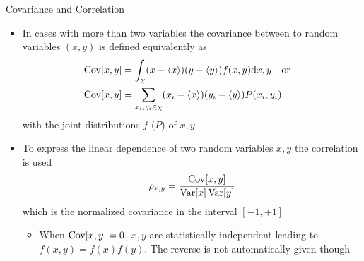   \begin{frame}{Covariance and Correlation}
    \begin{itemize}
      \item In cases with more than two variables the covariance between to random variables $(x, y)$ is defined equivalently as
        \begin{align*}
          \operatorname{Cov}[x, y] &= \int_\chi (x-\langle x\rangle)(y-\langle y\rangle) f(x,y) \mathrm{d}x, y
          \quad\mathrm{or}\quad \\
          \operatorname{Cov}[x, y] &= \sum_{x_i,y_i\in\chi}(x_i - \langle x\rangle)(y_i - \langle y\rangle) P(x_i, y_i)
        \end{align*}
        with the joint distributions $f$ ($P$) of $x, y$
      \item To express the linear dependence of two random variables $x, y$ the correlation is used
      \begin{equation*}
        \rho_{x,y} = \frac{\operatorname{Cov}[x, y]}{\operatorname{Var}[x]\operatorname{Var}[y]}
      \end{equation*}
      which is the normalized covariance in the interval $[-1, +1]$
      \begin{itemize}
        \item When $\operatorname{Cov}[x,y] = 0$, $x,y$ are statistically independent leading to $f(x,y) = f(x)f(y)$. The reverse is not automatically given though
      \end{itemize}
    \end{itemize}
  \end{frame}

